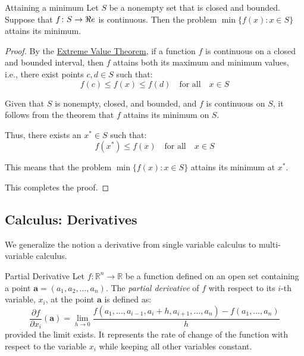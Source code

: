 \begin{center}
\par{}\label{fig:local-min}%

\end{center}


\begin{theorem}{Attaining a minimum}{}
Let $S$ be a nonempty set that is closed and bounded.  Suppose that $f \colon S \to \Re e$ is continuous.  Then the problem $\min\{ f(x) : x \in S\}$ attains its minimum.
\end{theorem}
\begin{proof}
By the \href{https://en.wikipedia.org/wiki/Extreme_value_theorem}{Extreme Value Theorem}, if a function \( f \) is continuous on a closed and bounded interval, then \( f \) attains both its maximum and minimum values, i.e., there exist points \( c, d \in S \) such that:
\[
f(c) \leq f(x) \leq f(d) \quad \text{for all} \quad x \in S
\]

Given that \( S \) is nonempty, closed, and bounded, and \( f \) is continuous on \( S \), it follows from the theorem that \( f \) attains its minimum on \( S \).

Thus, there exists an \( x^* \in S \) such that:
\[
f(x^*) \leq f(x) \quad \text{for all} \quad x \in S
\]

This means that the problem \( \min\{ f(x) : x \in S\} \) attains its minimum at \( x^* \).

This completes the proof.
\end{proof}

\subsection{Calculus: Derivatives}
We generalize the notion a derivative from single variable calculus to multi-variable calculus.

\begin{definition}{Partial Derivative}{}
Let \( f: \mathbb{R}^n \rightarrow \mathbb{R} \) be a function defined on an open set containing a point \( \mathbf{a} = (a_1, a_2, \dots, a_n) \). The \emph{partial derivative} of \( f \) with respect to its \( i \)-th variable, \( x_i \), at the point \( \mathbf{a} \) is defined as:
\[
\frac{\partial f}{\partial x_i} (\mathbf{a}) = \lim_{{h} \to 0} \frac{f(a_1, \dots, a_{i-1}, a_i + h, a_{i+1}, \dots, a_n) - f(a_1, \dots, a_n)}{h}
\]
provided the limit exists. It represents the rate of change of the function with respect to the variable \( x_i \) while keeping all other variables constant.
\end{definition}

